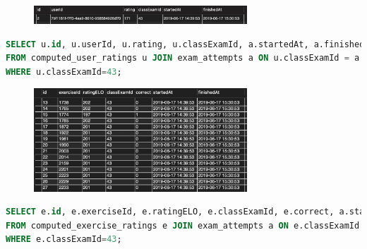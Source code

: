 \documentclass{IEEEtran}
\begin{document}
\lstset{basicstyle=\tiny,style=SQLstyle}
\begin{figure}[h!]
    \includegraphics[width=8cm]{PrimerTabeleUser}
    \label{fig:example}%
\end{figure}

\begin{lstlisting}[language=SQL]
SELECT u.id, u.userId, u.rating, u.classExamId, a.startedAt, a.finishedAt 
FROM computed_user_ratings u JOIN exam_attempts a ON u.classExamId = a.classExamId 
WHERE u.classExamId=43;
\end{lstlisting}

\begin{figure}[h!]
    \includegraphics[width=8cm]{PrimerTabele}
    \label{fig:example}%
\end{figure}
\begin{lstlisting}[language=SQL]
SELECT e.id, e.exerciseId, e.ratingELO, e.classExamId, e.correct, a.startedAt, a.finishedAt 
FROM computed_exercise_ratings e JOIN exam_attempts a ON e.classExamId = a.classExamId 
WHERE e.classExamId=43;
\end{lstlisting}
\end{document}
